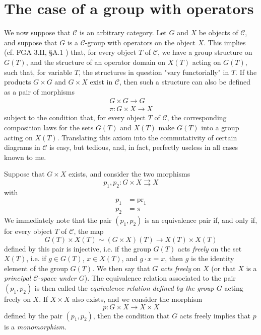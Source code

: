 \section{The case of a group with operators}\label{fga3.iii-3}

We now suppose that $\mathcal{C}$ is an arbitrary category.
Let $G$ and $X$ be objects of $\mathcal{C}$, and suppose that $G$ is a $\mathcal{C}$-group with operators on the object $X$.
This implies (cf. FGA 3.II, §A.1 ) that, for every object $T$ of $\mathcal{C}$, we have a group structure on $G(T)$, and the structure of an operator domain on $X(T)$ acting on $G(T)$, such that, for variable $T$, the structures in question "vary functorially" in $T$.
If the products $G\times G$ and $G\times X$ exist in $\mathcal{C}$, then such a structure can also be defined as a pair of morphisms
\[
    \begin{gathered}
        G\times G\to G \\
        \pi\colon G\times X\to X
    \end{gathered}
\]
subject to the condition that, for every object $T$ of $\mathcal{C}$, the corresponding composition laws for the sets $G(T)$ and $X(T)$ make $G(T)$ into a group acting on $X(T)$.
Translating this axiom into the commutativity of certain diagrams in $\mathcal{C}$ is easy, but tedious, and, in fact, perfectly useless in all cases known to me.


Suppose that $G\times X$ exists, and consider the two morphisms
\[
    p_1,p_2\colon G\times X\rightrightarrows X
\]
with
\[
    \begin{aligned}
        p_1 & = \mathrm{pr}_1\\
        p_2 &= \pi
    \end{aligned}
\]
We immediately note that the pair $(p_1,p_2)$ is an equivalence pair if, and only if, for every object $T$ of $\mathcal{C}$, the map
\[
    G(T)\times X(T) \sim (G\times X)(T) \to X(T)\times X(T)
\]
defined by this pair is injective, i.e. if the group $G(T)$ acts \emph{freely} on the set $X(T)$, i.e. if $g\in G(T)$, $x\in X(T)$, and $g\cdot x=x$, then $g$ is the identity element of the group $G(T)$.
We then say that $G$ \emph{acts freely} on $X$ (or that $X$ is a \emph{principal $\mathcal{C}$-space under $G$}).
The equivalence relation associated to the pair $(p_1,p_2)$ is then called the \emph{equivalence relation defined by the group $G$} acting freely on $X$.
If $X\times X$ also exists, and we consider the morphism
\[ p\colon G\times X\to X\times X \]
defined by the pair $(p_1,p_2)$, then the condition that $G$ acts freely implies that $p$ is a \emph{monomorphism}.

